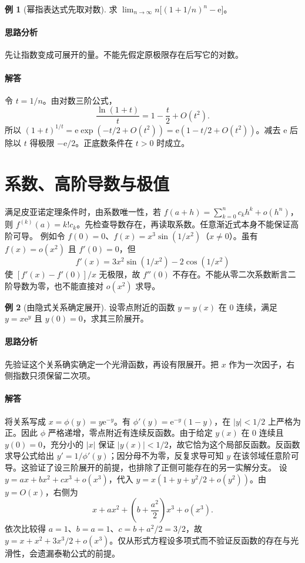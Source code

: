 \documentclass[UTF8,fontset=fandol,12pt,oneside,openany]{ctexrep}
\newcommand{\ee}{\mathrm e}
\theoremstyle{definition}
\newtheorem{example}{例}[chapter]
\begin{document}
\begin{example}[幂指表达式先取对数]求 $\displaystyle\lim_{n\to\infty}n\bigl[(1+1/n)^n-\ee\bigr]$。\end{example}
\paragraph{思路分析}先让指数变成可展开的量。不能先假定原极限存在后写它的对数。
\paragraph{解答}令 $t=1/n$。由对数三阶公式，
\[
\frac{\ln(1+t)}t=1-\frac t2+O(t^2).
\]
所以 $(1+t)^{1/t}=\ee\exp(-t/2+O(t^2))=\ee(1-t/2+O(t^2))$。减去 $\ee$ 后除以 $t$ 得极限 $-\ee/2$。正底数条件在 $t>0$ 时成立。

\section{系数、高阶导数与极值}
\label{lec:08:derivative}
满足皮亚诺定理条件时，由系数唯一性，若 $f(a+h)=\sum_{k=0}^nc_kh^k+o(h^n)$，则 $f^{(k)}(a)=k!c_k$。先检查导数存在，再读取系数。任意渐近式本身不能保证高阶可导。
例如令 $f(0)=0$、$f(x)=x^3\sin(1/x^2)$（$x\ne0$）。虽有 $f(x)=o(x^2)$ 且 $f'(0)=0$，但
\[
f'(x)=3x^2\sin(1/x^2)-2\cos(1/x^2)
\]
使 $[f'(x)-f'(0)]/x$ 无极限，故 $f''(0)$ 不存在。不能从零二次系数断言二阶导数为零，也不能直接对 $o(x^2)$ 求导。

\begin{example}[由隐式关系确定展开]设零点附近的函数 $y=y(x)$ 在 $0$ 连续，满足 $y=x\ee^y$ 且 $y(0)=0$，求其三阶展开。\end{example}
\paragraph{思路分析}先验证这个关系确实确定一个光滑函数，再设有限展开。把 $x$ 作为一次因子，右侧指数只须保留二次项。
\paragraph{解答}将关系写成 $x=\phi(y)=y\ee^{-y}$。有 $\phi'(y)=\ee^{-y}(1-y)$，在 $|y|<1/2$ 上严格为正。因此 $\phi$ 严格递增，零点附近有连续反函数。由于给定 $y(x)$ 在 $0$ 连续且 $y(0)=0$，充分小的 $|x|$ 保证 $|y(x)|<1/2$，故它恰为这个局部反函数。反函数求导公式给出 $y'=1/\phi'(y)$；因分母不为零，反复求导可知 $y$ 在该邻域任意阶可导。这验证了设三阶展开的前提，也排除了正侧可能存在的另一实解分支。
设 $y=ax+bx^2+cx^3+o(x^3)$，代入 $y=x(1+y+y^2/2+o(y^2))$。由 $y=O(x)$，右侧为
\[
x+ax^2+\left(b+\frac{a^2}2\right)x^3+o(x^3).
\]
依次比较得 $a=1$、$b=a=1$、$c=b+a^2/2=3/2$，故 $y=x+x^2+3x^3/2+o(x^3)$。仅从形式方程设多项式而不验证反函数的存在与光滑性，会遗漏泰勒公式的前提。
\end{document}

